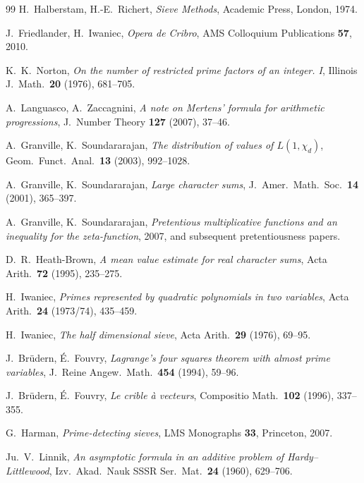 \documentclass[11pt]{article}
\theoremstyle{plain}
\theoremstyle{definition}
\theoremstyle{remark}
\renewcommand{\_}{\textunderscore\allowbreak}
\begin{document}
\begin{thebibliography}{99}
 H.~Halberstam, H.-E.~Richert, \emph{Sieve Methods}, Academic
Press, London, 1974.

 J.~Friedlander, H.~Iwaniec, \emph{Opera de Cribro}, AMS Colloquium
Publications \textbf{57}, 2010.

 K.~K.~Norton, \emph{On the number of restricted prime factors of an integer.
I}, Illinois J.\ Math.\ \textbf{20} (1976), 681--705.

 A.~Languasco, A.~Zaccagnini, \emph{A note on Mertens' formula
for arithmetic progressions}, J.\ Number Theory \textbf{127} (2007), 37--46.

 A.~Granville, K.~Soundararajan, \emph{The distribution of
values of $L(1,\chi_d)$}, Geom.\ Funct.\ Anal.\ \textbf{13} (2003), 992--1028.

 A.~Granville, K.~Soundararajan, \emph{Large character sums},
J.\ Amer.\ Math.\ Soc.\ \textbf{14} (2001), 365--397.

 A.~Granville, K.~Soundararajan, \emph{Pretentious
multiplicative functions and an inequality for the zeta-function}, 2007, and subsequent
pretentiousness papers.

 D.~R.~Heath-Brown, \emph{A mean value estimate for real character sums},
Acta Arith.\ \textbf{72} (1995), 235--275.

 H.~Iwaniec, \emph{Primes represented by quadratic polynomials in two
variables}, Acta Arith.\ \textbf{24} (1973/74), 435--459.

 H.~Iwaniec, \emph{The half dimensional sieve}, Acta Arith.\ \textbf{29}
(1976), 69--95.

 J.~Br\"udern, \'E.~Fouvry, \emph{Lagrange's four squares theorem with
almost prime variables}, J.\ Reine Angew.\ Math.\ \textbf{454} (1994), 59--96.

 J.~Br\"udern, \'E.~Fouvry, \emph{Le crible \`a vecteurs}, Compositio
Math.\ \textbf{102} (1996), 337--355.

 G.~Harman, \emph{Prime-detecting sieves}, LMS Monographs \textbf{33},
Princeton, 2007.

 Ju.~V.~Linnik, \emph{An asymptotic formula in an additive problem of
Hardy--Littlewood}, Izv.\ Akad.\ Nauk SSSR Ser.\ Mat.\ \textbf{24} (1960), 629--706.


\end{thebibliography}
\end{document}
